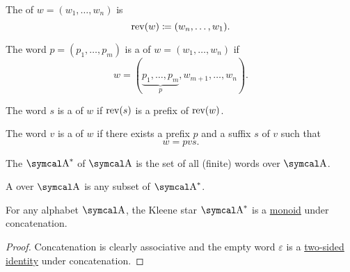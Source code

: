\begin{definition}
\begin{DefEnum}
     The  of \( w = (w_1, \ldots, w_n) \) is
    \begin{equation*}
      \operatorname{rev}(w) \coloneqq (w_n, \ldots, w_1).
    \end{equation*}

     The word \( p = (p_1, \ldots, p_m) \) is a  of \( w = (w_1, \ldots, w_n) \) if
    \begin{equation*}
      w = (\underbrace{p_1, \ldots, p_m}_p, w_{m+1}, \ldots, w_n).
    \end{equation*}

     The word \( s \) is a  of \( w \) if \( \operatorname{rev}(s) \) is a prefix of \( \operatorname{rev}(w) \).

     The word \( v \) is a  of \( w \) if there exists a prefix \( p \) and a suffix \( s \) of \( v \) such that
    \begin{equation*}
      w = pvs.
    \end{equation*}

     The  \( \CA^{\ast} \) of \( \CA \) is the set of all (finite) words over \( \CA \).

     A  over \( \CA \) is any subset of \( \CA^{\ast} \).
  \end{DefEnum}

\end{definition}

\begin{proposition}\label{thm:kleene_star_is_monoid}
  For any alphabet \( \CA \), the Kleene star \( \CA^{\ast} \) is a \hyperref[def:unital_magma/associative]{monoid} under concatenation.
\end{proposition}
\begin{proof}
  Concatenation is clearly associative and the empty word \( \varepsilon \) is a \hyperref[def:magma_identity]{two-sided identity} under concatenation.
\end{proof}
